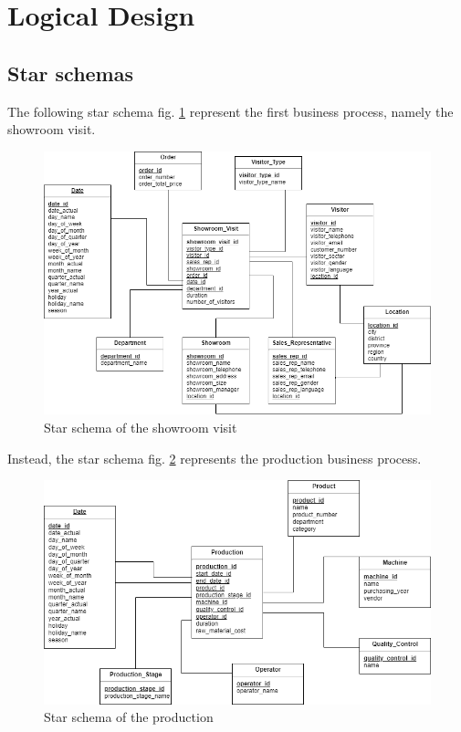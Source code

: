 \documentclass[letterpaper,12pt]{article}
\begin{document}
\section{Logical Design}

\subsection{Star schemas}

The following star schema fig. \ref{fig:starschemaShowroom} represent the first business process, namely the showroom visit.

\begin{figure}[H] 
        \centering
        \includegraphics[width=\columnwidth]{../images/Starschema_Showroom_visit.png}
        \caption{
                \label{fig:starschemaShowroom}  
                Star schema of the showroom visit
        }
\end{figure}

Instead, the star schema fig. \ref{fig:starschemaProduction} represents the production business process.

\begin{figure}[H] 
        \centering
        \includegraphics[width=\columnwidth]{../images/Starschema_Production.png}
        \caption{
                \label{fig:starschemaProduction}  
                Star schema of the production
        }
\end{figure}
\end{document}
